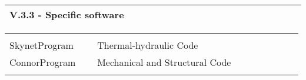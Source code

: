 \documentclass[11pt, letterpaper]{extarticle}
\begin{document}

	\label{sec:V.3.3.}
	\begin{longtable}{L{1.012\linewidth}N}
		\textbf{\large V.3.3 - Specific software} & \\[0.60cm] \hline
	\end{longtable}

	\begin{longtable}{L{0.304\linewidth}L{0.684\linewidth}N}
		                                                                                                                                                       &                                                                                                                                                        & \\[-0.25cm]
		SkynetProgram                                                                                                                                          & Thermal-hydraulic Code                                                                                                                                 & \\[0.40cm]
		ConnorProgram                                                                                                                                          & Mechanical and Structural Code                                                                                                                         & \\[0.40cm]
		                                                                                                                                                       &                                                                                                                                                        & \\[-0.25cm] \hline
	\end{longtable}
\end{document}
